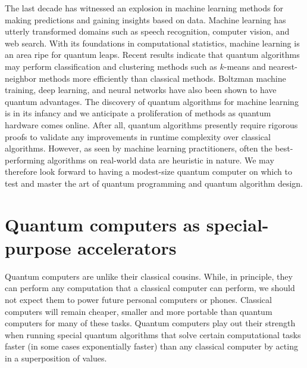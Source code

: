 \documentclass[journal]{IEEEtran}
\begin{document}
The last decade has witnessed an explosion in machine learning methods for making predictions and gaining insights based on data.  Machine learning has utterly transformed domains such as speech recognition, computer vision, and web search.  With its foundations in computational statistics, machine learning is an area ripe for quantum leaps.  Recent results indicate that quantum algorithms may perform classification and clustering methods such as $k$-means and nearest-neighbor methods more efficiently than  classical methods.  Boltzman machine training, deep learning, and neural networks have also been shown to have quantum advantages.  The discovery of quantum algorithms for machine learning is in its infancy and we anticipate a proliferation of methods as quantum hardware comes online.  After all, quantum algorithms presently require rigorous proofs to validate any improvements in runtime complexity over classical algorithms.  However, as seen by machine learning practitioners, often the best-performing algorithms on real-world data are heuristic in nature.  We may therefore look forward to having a modest-size quantum computer on which to test and master the art of quantum programming and quantum algorithm design. 


\section{Quantum computers as special-purpose accelerators }


Quantum computers are unlike their classical cousins.  While, in principle,  they can perform any computation that a classical computer can perform, we should not expect them to power future personal computers or phones. Classical computers will remain cheaper, smaller and more portable than quantum computers for many of these tasks. Quantum computers play out their strength when running special quantum algorithms that solve certain computational tasks faster (in some cases exponentially faster) than any classical computer by acting in a superposition of values.  
\end{document}

